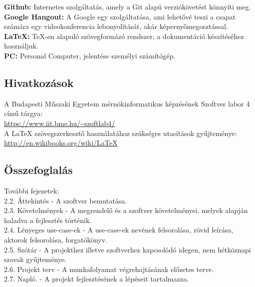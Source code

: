 \noindent\textbf{Github:} Internetes szolgáltatás, amely a Git alapú verziókövetést könnyíti meg.\\

\noindent\textbf{Google Hangout:} A Google egy szolgáltatása, ami lehetővé teszi a csapat számára egy videokonferencia lebonyolítását, akár képernyőmegosztással.\\

\noindent\textbf{LaTeX:} TeX-en alapuló szövegformázó rendszer, a dokumentáció készítéséhez használjuk.\\

\noindent\textbf{PC:} Personal Computer, jelentése személyi számítógép.


\subsection{Hivatkozások}

A Budapesti Műszaki Egyetem mérnökinformatikus képzésének Szoftver labor 4 című tárgya:  \\
\url{https://www.iit.bme.hu/~szoftlab4/}\\

A LaTeX szövegszerkesztő használatához szükséges utasítások gyűjteménye:\\
\url{http://en.wikibooks.org/wiki/LaTeX}\\


\subsection{Összefoglalás}

 További fejezetek:\\

 2.2. Áttekintés - A szoftver bemutatása.\\

 2.3. Követelmények - A megrendelő és a szoftver követelményei, melyek alapján haladva a fejlesztés történik.\\

 2.4. Lényeges use-case-ek - A use-case-ek nevének felsorolása, rövid leírása, aktorok felsorolása, forgatókönyv.\\

 2.5. Szótár - A projekthez illetve szoftverhez kapcsolódó idegen, nem hétköznapi szavak gyűjteménye.\\

 2.6. Projekt terv - A munkafolyamat végrehajtásának előzetes terve.\\

 2.7. Napló. - A projekt fejlesztésének a lépéseit tartalmazza.